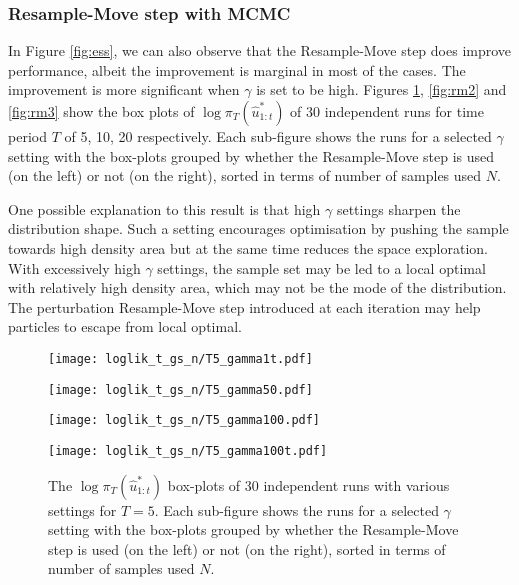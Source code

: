 \subsubsection{Resample-Move step with MCMC}
In Figure \ref{fig:ess}, we can also observe that the Resample-Move step does improve performance, albeit the improvement is marginal  in most of the cases. The improvement is more significant when $\gamma$ is set to be high. Figures \ref{fig:rm1}, \ref{fig:rm2} and \ref{fig:rm3} show the box plots of $\log\pi_T(\hat{u}^*_{1:t})$ of $30$ independent runs for time period $T$ of 5, 10, 20 respectively. Each sub-figure shows the runs for a selected $\gamma$ setting with the box-plots grouped by whether the Resample-Move step is used (on the left) or not (on the right), sorted in terms of number of samples used $N$.

One possible explanation to this result is that high $\gamma$ settings sharpen the distribution shape. Such a setting encourages optimisation by pushing the sample towards  high density area but at the same time reduces the space exploration. With excessively high $\gamma$ settings, the sample set may be led to a local optimal with relatively high density area, which may not be the mode of the distribution. The perturbation Resample-Move step introduced at each iteration may help particles to escape from local optimal.

\begin{figure}[!thbp]
    \centering
    \begin{minipage}{.5\textwidth}
        \centering
        \texttt{[image: loglik\_t\_gs\_n/T5\_gamma1t.pdf]}
    \end{minipage}%
    \begin{minipage}{0.5\textwidth}
        \centering
        \texttt{[image: loglik\_t\_gs\_n/T5\_gamma50.pdf]}
    \end{minipage}
    \begin{minipage}{0.5\textwidth}
        \centering
        \texttt{[image: loglik\_t\_gs\_n/T5\_gamma100.pdf]}
    \end{minipage}%
    \begin{minipage}{0.5\textwidth}
        \centering
        \texttt{[image: loglik\_t\_gs\_n/T5\_gamma100t.pdf]}
    \end{minipage}
    \caption{The $\log\pi_T(\hat{u}^*_{1:t})$ box-plots of 30 independent runs with various settings for $T=5$. Each sub-figure shows the runs for a selected $\gamma$ setting with the box-plots grouped by whether the Resample-Move step is used (on the left) or not (on the right), sorted in terms of number of samples used $N$.}
    \label{fig:rm1}
\end{figure}

